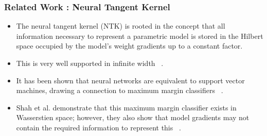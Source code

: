 \begin{frame}
  \frametitle{Related Work : Neural Tangent Kernel}
  \begin{itemize}
  \item The neural tangent kernel (NTK) is rooted in the
  concept that all information necessary to represent a parametric
  model is stored in the Hilbert space occupied by the model's weight
  gradients up to a constant factor. 
  
\item This is very well supported in infinite width ~\citep{jacot2018neural}. 

  \item It has been shown that neural networks are equivalent to
    support vector machines, drawing a connection to maximum margin
    classifiers ~\citep{chen2021equivalence, chizat2020maxmargin}.
    \item  Shah et al. demonstrate that this maximum margin classifier exists in Wasserstien space; however, they also show that model gradients may not contain the required information to represent this ~\citep{shah2021input}.
    \end{itemize}
  \end{frame}
  
